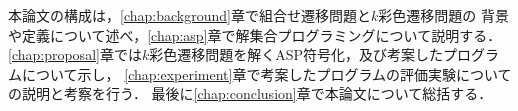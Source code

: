 本論文の構成は，\ref{chap:background}章で組合せ遷移問題と$k$彩色遷移問題の
背景や定義について述べ，\ref{chap:asp}章で解集合プログラミングについて説明する．
\ref{chap:proposal}章では$k$彩色遷移問題を解くASP符号化，及び考案したプログラムについて示し，
\ref{chap:experiment}章で考案したプログラムの評価実験についての説明と考察を行う．
最後に\ref{chap:conclusion}章で本論文について総括する．









